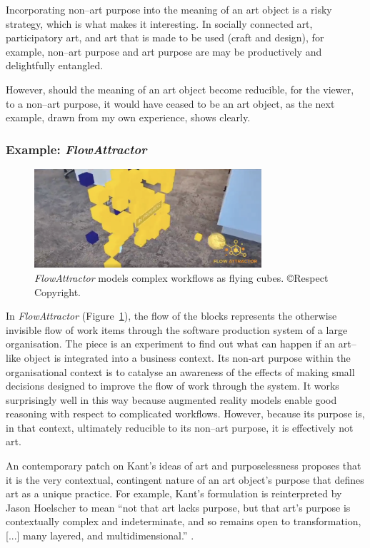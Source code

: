 \documentclass[letter:wpaper]{article}
\begin{document}
    Incorporating non–art purpose into the meaning of an art object is a risky strategy, which is what makes it interesting. In socially connected art, participatory art, and art that is made to be used (craft and design), for example, non–art purpose and art purpose are may be productively and delightfully entangled. 
    
    However, should the meaning of an art object become reducible, for the viewer, to a non–art purpose, it would have ceased to be an art object, as the next example, drawn from my own experience, shows clearly.

    \subsubsection{Example: \emph{FlowAttractor}}

    \begin{figure}[h]
        \includegraphics[width=3.31in]{flow-attractor.png}
        \caption{\emph{FlowAttractor} models complex workflows as flying cubes. \copyright Respect Copyright.}
        \label{fig:flow-attractor}
    \end{figure}

    In \emph{FlowAttractor} (Figure~\ref{fig:flow-attractor}), the flow of the blocks represents the otherwise invisible flow of work items through the software production system of a large organisation. The piece is an experiment to find out what can happen if an art–like object is integrated into a business context. Its non-art purpose within the organisational context is to catalyse an awareness of the effects of making small decisions designed to improve the flow of work through the system. It works surprisingly well in this way because augmented reality models enable good reasoning with respect to complicated workflows. However, because its purpose is, in that context, ultimately reducible to its non–art purpose, it is effectively not art.
    
    An contemporary patch on Kant's ideas of art and purposelessness proposes that it is the very contextual, contingent nature of an art object's purpose that defines art as a unique practice. For example, Kant's formulation is reinterpreted by Jason Hoelscher to mean ``not that art lacks purpose, but that art's purpose is contextually complex and indeterminate, and so remains open to transformation, [...] many layered, and multidimensional.'' \citep[p.25]{HoelscherThPtcsOfPhsSpc2014}.
\end{document}
